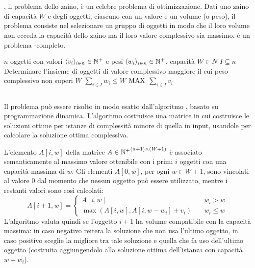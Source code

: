 \section{\Knapsack}
\Knapsack, il problema dello zaino, è un celebre problema di ottimizzazione.
Dati uno zaino di capacità $W$ e degli oggetti, ciascuno con un valore e un volume (o peso), il problema consiste nel selezionare un gruppo di oggetti in modo che il loro volume non ecceda la capacità dello zaino ma il loro valore complessivo sia massimo.
\Knapsack è un problema \NPO-completo.

\popt{\Knapsack}
{$n$ oggetti con valori $\langle v_i \rangle_{i\in n}\in\mathbb N^+$ e pesi $\langle w_i \rangle_{i\in n}\in\mathbb N^+$, capacità $W\in N$}
{$I\subseteq n$}
{Determinare l'insieme di oggetti di valore complessivo maggiore il cui peso complessivo non superi $W$}
{$\sum_{i\in I}w_i\leq W$}
{$\mathrm{MAX}$}
{$\sum_{i\in I} v_i$}


\subsection{\DynamicKnapsack}
Il problema può essere risolto in modo esatto dall'algoritmo \DynamicKnapsack, basato su programmazione dinamica.
L'algoritmo costruisce una matrice in cui costruisce le soluzioni ottime per istanze di complessità minore di quella in input, usandole per calcolare la soluzione ottima complessiva.

L'elemento $A[i,w]$ della matrice $A\in{\mathbb N^+}^{(n+1)\times (W+1)}$ è associato semanticamente al massimo valore ottenibile con i primi $i$ oggetti con una capacità massima di $w$.
Gli elementi $A[0,w]$, per ogni $w\in W+1$, sono vincolati al valore $0$ dal momento che nessun oggetto può essere utilizzato, mentre i restanti valori sono così calcolati:
\begin{equation*}
	A[i+1,w] =
	\begin{cases}
		A[i,w]                       & \quad w_i>w     \\
		\max(A[i,w], A[i,w-w_i]+v_i) & \quad w_i\leq w
	\end{cases}
\end{equation*}
L'algoritmo valuta quindi se l'oggetto $i+1$ ha volume compatibile con la capacità massima: in caso negativo reitera la soluzione che non usa l'ultimo oggetto, in caso positivo sceglie la migliore tra tale soluzione e quella che fa uso dell'ultimo oggetto (costruita aggiungendolo alla soluzione ottima dell'istanza con capacità $w-w_i$).

